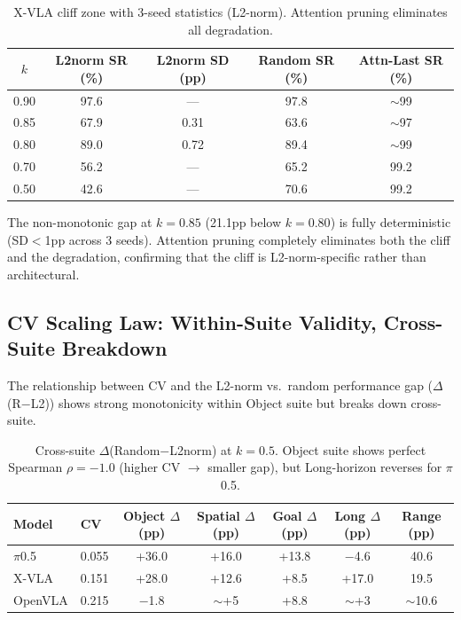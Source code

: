 \documentclass[letterpaper]{article}
\begin{document}
\begin{table}[h]
\centering
\caption{X-VLA cliff zone with 3-seed statistics (L2-norm). Attention pruning eliminates all degradation.}
\label{tab:xvla_cliff}
\begin{tabular}{ccccc}
\toprule
$k$ & L2norm SR (\%) & L2norm SD (pp) & Random SR (\%) & Attn-Last SR (\%) \\
\midrule
0.90 & 97.6 & --- & 97.8 & $\sim$99 \\
0.85 & 67.9 & 0.31 & 63.6 & $\sim$97 \\
0.80 & 89.0 & 0.72 & 89.4 & $\sim$99 \\
0.70 & 56.2 & --- & 65.2 & 99.2 \\
0.50 & 42.6 & --- & 70.6 & 99.2 \\
\bottomrule
\end{tabular}
\end{table}

The non-monotonic gap at $k=0.85$ (21.1pp below $k=0.80$) is fully deterministic (SD$<$1pp across 3 seeds).
Attention pruning completely eliminates both the cliff and the degradation, confirming that the cliff is L2-norm-specific rather than architectural.

\subsection{CV Scaling Law: Within-Suite Validity, Cross-Suite Breakdown}

The relationship between CV and the L2-norm vs.\ random performance gap ($\Delta$(R$-$L2)) shows strong monotonicity within Object suite but breaks down cross-suite.

\begin{table}[h]
\centering
\caption{Cross-suite $\Delta$(Random$-$L2norm) at $k=0.5$. Object suite shows perfect Spearman $\rho=-1.0$ (higher CV $\rightarrow$ smaller gap), but Long-horizon reverses for $\pi$0.5.}
\label{tab:cv_scaling}
\begin{tabular}{llccccc}
\toprule
Model & CV & Object $\Delta$ (pp) & Spatial $\Delta$ (pp) & Goal $\Delta$ (pp) & Long $\Delta$ (pp) & Range (pp) \\
\midrule
$\pi$0.5 & 0.055 & +36.0 & +16.0 & +13.8 & $-$4.6 & 40.6 \\
X-VLA & 0.151 & +28.0 & +12.6 & +8.5 & +17.0 & 19.5 \\
OpenVLA & 0.215 & $-$1.8 & $\sim$+5 & +8.8 & $\sim$+3 & $\sim$10.6 \\
\bottomrule
\end{tabular}
\end{table}
\end{document}

